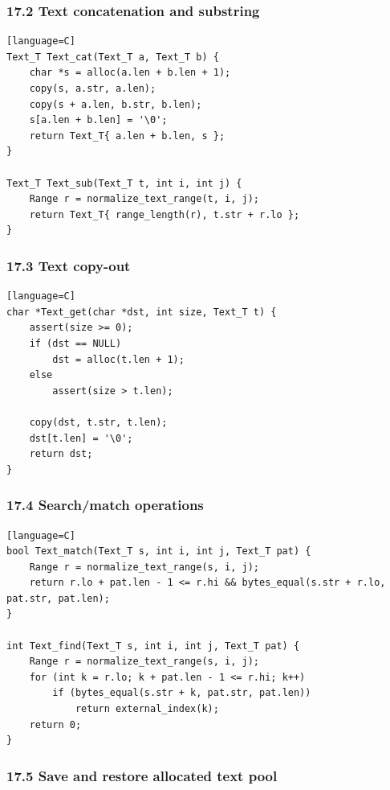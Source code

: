 \documentclass[11pt]{article}
\begin{document}
\subsubsection{17.2 Text concatenation and substring}\label{text-concatenation-and-substring}

\begin{verbatim}[language=C]
Text_T Text_cat(Text_T a, Text_T b) {
    char *s = alloc(a.len + b.len + 1);
    copy(s, a.str, a.len);
    copy(s + a.len, b.str, b.len);
    s[a.len + b.len] = '\0';
    return Text_T{ a.len + b.len, s };
}

Text_T Text_sub(Text_T t, int i, int j) {
    Range r = normalize_text_range(t, i, j);
    return Text_T{ range_length(r), t.str + r.lo };
}
\end{verbatim}

\subsubsection{17.3 Text copy-out}\label{text-copy-out}

\begin{verbatim}[language=C]
char *Text_get(char *dst, int size, Text_T t) {
    assert(size >= 0);
    if (dst == NULL)
        dst = alloc(t.len + 1);
    else
        assert(size > t.len);

    copy(dst, t.str, t.len);
    dst[t.len] = '\0';
    return dst;
}
\end{verbatim}

\subsubsection{17.4 Search/match operations}\label{searchmatch-operations}

\begin{verbatim}[language=C]
bool Text_match(Text_T s, int i, int j, Text_T pat) {
    Range r = normalize_text_range(s, i, j);
    return r.lo + pat.len - 1 <= r.hi && bytes_equal(s.str + r.lo, pat.str, pat.len);
}

int Text_find(Text_T s, int i, int j, Text_T pat) {
    Range r = normalize_text_range(s, i, j);
    for (int k = r.lo; k + pat.len - 1 <= r.hi; k++)
        if (bytes_equal(s.str + k, pat.str, pat.len))
            return external_index(k);
    return 0;
}
\end{verbatim}

\subsubsection{17.5 Save and restore allocated text pool}\label{save-and-restore-allocated-text-pool}
\end{document}
